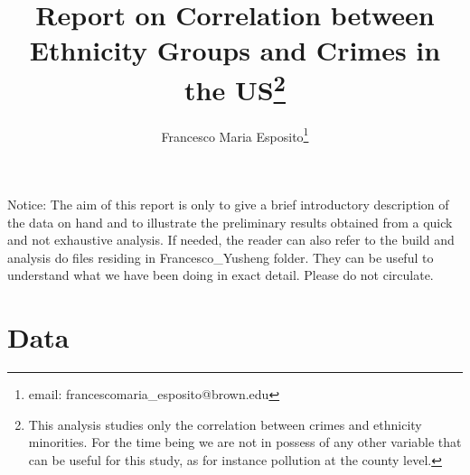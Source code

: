 \documentclass[a4paper,12pt]{article}
\begin{document}
\title{Report on Correlation between Ethnicity Groups and Crimes in the US\footnote{This analysis studies only the correlation between crimes and ethnicity minorities. For the time being we are not in possess of any other variable that can be useful for this study, as for instance pollution at the county level.}}
\author{Francesco Maria Esposito\footnote{email: francescomaria\_esposito@brown.edu}}
\maketitle
\noindent
Notice: The aim of this report is only to give a brief introductory description of the data on hand and to illustrate the preliminary results obtained from a quick and not exhaustive analysis. If needed, the reader can also refer to the build and analysis do files residing in Francesco\_Yusheng folder. They can be useful to understand what we have been doing in exact detail. Please do not circulate.
\newpage
\tableofcontents
\listoftables
\listoffigures
\newpage
\section{Data}
\end{document}
